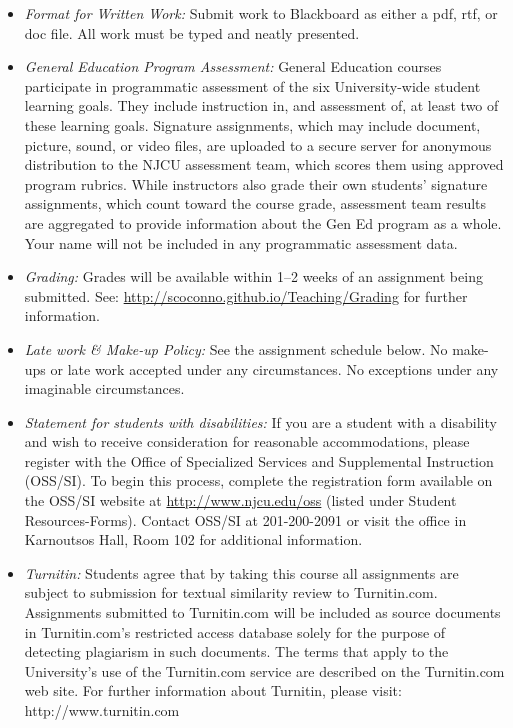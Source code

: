 \documentclass[article,oneside]{memoir}
\begin{document}
\begin{itemize}
\item \textit{Format for Written Work:} Submit work to Blackboard as either a pdf, rtf, or doc file. All work must be typed and neatly presented. 


\item \textit{General Education Program Assessment:} General Education courses participate in programmatic assessment of the six University-wide student learning goals. They include instruction in, and assessment of, at least two of these learning goals. Signature assignments, which may include document, picture, sound, or video files, are uploaded to a secure server for anonymous distribution to the NJCU assessment team, which scores them using approved program rubrics. While instructors also grade their own students’ signature assignments, which count toward the course grade, assessment team results are aggregated to provide information about the Gen Ed program as a whole. Your name will not be included in any programmatic assessment data.

\item \textit{Grading:} Grades will be available within 1--2 weeks of an assignment being submitted. See: \href{http://scoconno.github.io/Teaching/Grading}{http://scoconno.github.io/Teaching/Grading} for further information.


\item \textit{Late work \& Make-up Policy:} See the assignment schedule below. No make-ups or late work accepted under any circumstances. No exceptions under any imaginable circumstances.

\item \textit{Statement for students with disabilities:} If you are a student
with a disability and wish to receive consideration for reasonable
accommodations, please register with the Office of Specialized Services
and Supplemental Instruction (OSS/SI). To begin this process, complete
the registration form available on the OSS/SI website at
\href{http://www.njcu.edu/oss}{http://www.njcu.edu/oss}
(listed under Student Resources-Forms). Contact OSS/SI at 201-200-2091
or visit the office in Karnoutsos Hall, Room 102 for additional
information.

\item \textit{Turnitin:} Students agree that by taking this course all assignments are subject to submission for textual similarity review to Turnitin.com. Assignments submitted to Turnitin.com will be included as source documents in Turnitin.com's restricted access database solely for the purpose of detecting plagiarism in such documents.  The terms that apply to the University’s use of the Turnitin.com service are described on the Turnitin.com web site.  For further information about Turnitin, please visit: http://www.turnitin.com 


\end{itemize}
\end{document}
